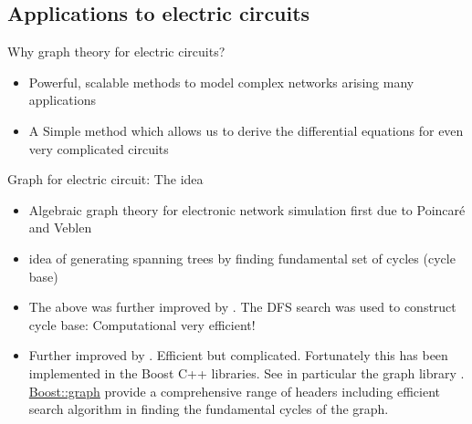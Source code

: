 \documentclass[xcolor=dvipsnames]{beamer}
\begin{document}
\subsection{Applications to electric circuits}

\begin{frame}{Why graph theory for electric circuits?}
	\begin{itemize}
		\item Powerful, scalable methods to model complex networks arising many applications
		\item A Simple method which allows us to derive the differential equations for even very complicated circuits
	\end{itemize}
\end{frame}

\begin{frame}{Graph for electric circuit: The idea}
	\begin{itemize}
		\item Algebraic graph theory for electronic network simulation first due to Poincar\'e and Veblen
		\item  \href{https://dl.acm.org/doi/pdf/10.1145/363848.363861}{} idea of generating spanning trees by finding fundamental set of cycles (cycle base)
		\item The above was further improved by \href{http://www.cs.kent.edu/~dragan/GraphAn/CycleBasis/p514-paton.pdf}{}. The DFS search was used to construct cycle base: Computational very efficient!
		\item Further improved by \href{https://dl.acm.org/doi/pdf/10.1145/362814.362819}{}. Efficient but complicated. Fortunately this has been implemented in the Boost C++ libraries. See in particular the graph library . \hyperlink{https://www.boost.org/doc/libs/1_67_0/libs/graph/doc/graph_theory_review.html}{Boost::graph} provide a comprehensive range of headers including \href{https://www.boost.org/doc/libs/1_46_1/boost/graph/tiernan_all_cycles.hpp}{} efficient search algorithm in finding the fundamental cycles of the graph. 
	\end{itemize}
\end{frame}
\end{document}
